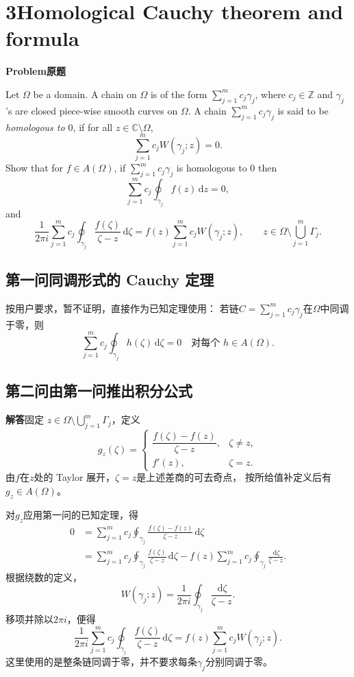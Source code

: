 \documentclass[11pt,a4paper]{ctexart}
\newcommand{\C}{\mathbb C}
\newcommand{\Z}{\mathbb Z}
\newcommand{\dd}{\,\mathrm d}
\newcommand{\problem}{\par\textbf{Problem\quad 原题}\par}
\newcommand{\solution}{\par\medskip\textbf{解答}\quad}
\begin{document}
\newpage
\section*{3\quad Homological Cauchy theorem and formula}
\problem
Let $\Omega$ be a domain. A chain on $\Omega$ is of the form
$\sum_{j=1}^{m}c_j\gamma_j$, where $c_j\in\Z$ and $\gamma_j$'s are closed
piece-wise smooth curves on $\Omega$.
A chain $\sum_{j=1}^{m}c_j\gamma_j$ is said to be \emph{homologous to $0$},
if for all $z\in\C\setminus\Omega$,
\[
 \sum_{j=1}^{m}c_jW(\gamma_j;z)=0.
\]
Show that for $f\in A(\Omega)$, if
$\sum_{j=1}^{m}c_j\gamma_j$ is homologous to $0$ then
\[
 \sum_{j=1}^{m}c_j\oint_{\gamma_j}f(z)\dd z=0,
\]
and
\[
 \frac1{2\pi i}\sum_{j=1}^{m}c_j
       \oint_{\gamma_j}\frac{f(\zeta)}{\zeta-z}\dd\zeta
 =f(z)\sum_{j=1}^{m}c_jW(\gamma_j;z),
 \qquad z\in\Omega\setminus\bigcup_{j=1}^{m}\Gamma_j.
\]

\subsection*{第一问\quad 同调形式的 Cauchy 定理}
按用户要求，暂不证明，直接作为已知定理使用：
若链$C=\sum_{j=1}^{m}c_j\gamma_j$在$\Omega$中同调于零，则
\[
 \boxed{\displaystyle
  \sum_{j=1}^{m}c_j\oint_{\gamma_j}h(\zeta)\dd\zeta=0
  \quad\text{对每个 }h\in A(\Omega).}
\]

\subsection*{第二问\quad 由第一问推出积分公式}
\solution 固定
$z\in\Omega\setminus\bigcup_{j=1}^{m}\Gamma_j$，定义
\[
 g_z(\zeta)=
 \begin{cases}
  \dfrac{f(\zeta)-f(z)}{\zeta-z},&\zeta\ne z,\\[6pt]
  f'(z),&\zeta=z.
 \end{cases}
\]
由$f$在$z$处的 Taylor 展开，$\zeta=z$是上述差商的可去奇点，
按所给值补定义后有$g_z\in A(\Omega)$。

对$g_z$应用第一问的已知定理，得
\begin{align*}
 0
 &=\sum_{j=1}^{m}c_j\oint_{\gamma_j}
         \frac{f(\zeta)-f(z)}{\zeta-z}\dd\zeta\\
 &=\sum_{j=1}^{m}c_j\oint_{\gamma_j}
         \frac{f(\zeta)}{\zeta-z}\dd\zeta
   -f(z)\sum_{j=1}^{m}c_j\oint_{\gamma_j}
         \frac{\dd\zeta}{\zeta-z}.
\end{align*}
根据绕数的定义，
\[
 W(\gamma_j;z)=\frac1{2\pi i}
                    \oint_{\gamma_j}\frac{\dd\zeta}{\zeta-z}.
\]
移项并除以$2\pi i$，便得
\[
 \boxed{\displaystyle
 \frac1{2\pi i}\sum_{j=1}^{m}c_j
       \oint_{\gamma_j}\frac{f(\zeta)}{\zeta-z}\dd\zeta
 =f(z)\sum_{j=1}^{m}c_jW(\gamma_j;z).}
\]
这里使用的是整条链同调于零，并不要求每条$\gamma_j$分别同调于零。
\end{document}
